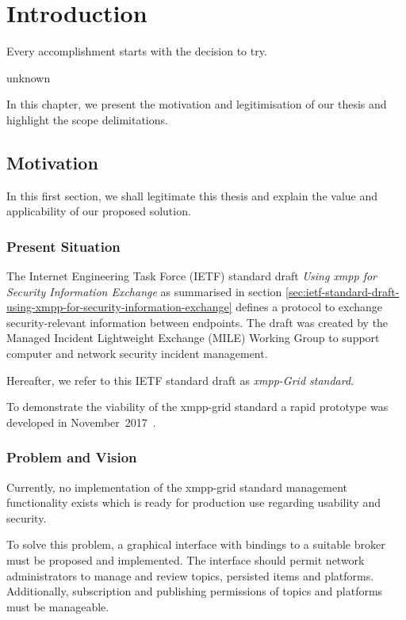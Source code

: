 \newcommand{\code}{\texttt}
\chapter{Introduction}
\label{sec:introduction}

\epigraph{Every accomplishment starts with the decision to try.}{unknown}
In this chapter, we present the motivation and legitimisation of our thesis and highlight the scope delimitations.

\section{Motivation}
In this first section, we shall legitimate this thesis and explain the value and applicability of our proposed solution.

\subsection{Present Situation}
The Internet Engineering Task Force (IETF) standard draft \emph{Using \gls{xmpp} for Security Information Exchange} \cite{ietf-mile-xmpp-grid-05} as summarised in section \ref{sec:ietf-standard-draft-using-xmpp-for-security-information-exchange} defines a protocol to exchange security-relevant information between endpoints.
The draft was created by the Managed Incident Lightweight Exchange (MILE) Working Group to support computer and network security incident management.

Hereafter, we refer to this IETF standard draft as \emph{\gls{xmpp}-Grid standard}.

To demonstrate the viability of the \gls{xmpp-grid} standard a rapid prototype was developed in November~2017~\cite{xmpp-grid-prototype}.

\subsection{Problem and Vision}
Currently, no implementation of the \gls{xmpp-grid} standard management functionality exists which is ready for production use regarding usability and security.

To solve this problem, a graphical interface with bindings to a suitable \gls{broker} must be proposed and implemented.
The interface should permit network administrators to manage and review \glspl{topic}, persisted items and \glspl{platform}.
Additionally, subscription and publishing permissions of \glspl{topic} and \glspl{platform} must be manageable.

